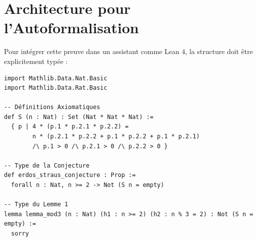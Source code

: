 \documentclass[12pt]{article}
\begin{document}
\section{Architecture pour l'Autoformalisation}
Pour intégrer cette preuve dans un assistant comme Lean 4, la structure doit être explicitement typée :

\begin{verbatim}
import Mathlib.Data.Nat.Basic
import Mathlib.Data.Rat.Basic

-- Définitions Axiomatiques
def S (n : Nat) : Set (Nat * Nat * Nat) :=
  { p | 4 * (p.1 * p.2.1 * p.2.2) =
        n * (p.2.1 * p.2.2 + p.1 * p.2.2 + p.1 * p.2.1)
        /\ p.1 > 0 /\ p.2.1 > 0 /\ p.2.2 > 0 }

-- Type de la Conjecture
def erdos_straus_conjecture : Prop :=
  forall n : Nat, n >= 2 -> Not (S n = empty)

-- Type du Lemme 1
lemma lemma_mod3 (n : Nat) (h1 : n >= 2) (h2 : n % 3 = 2) : Not (S n = empty) :=
  sorry
\end{verbatim}
\end{document}
